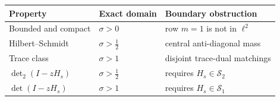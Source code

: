 \begin{tabular}{@{}lll@{}}
\toprule
Property & Exact domain & Boundary obstruction \\
\midrule
Bounded and compact & $\sigma>0$ & row $m=1$ is not in $\ell^2$ \\
Hilbert--Schmidt & $\sigma>\tfrac12$ & central anti-diagonal mass \\
Trace class & $\sigma>1$ & disjoint trace-dual matchings \\
$\det_2(I-zH_s)$ & $\sigma>\tfrac12$ & requires $H_s\in\mathcal S_2$ \\
$\det(I-zH_s)$ & $\sigma>1$ & requires $H_s\in\mathcal S_1$ \\
\bottomrule
\end{tabular}
